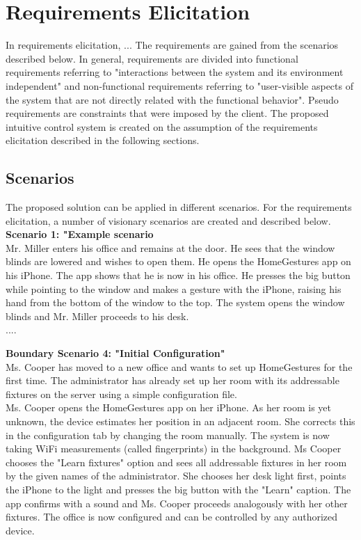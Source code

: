 
\chapter{Requirements Elicitation}
	
In requirements elicitation, ...
The requirements are gained from the scenarios described below. In general, requirements are divided into functional requirements referring to "interactions between the system and its environment independent" \cite{Bruegge2004} and non-functional requirements referring to "user-visible aspects of the system that are not directly related with the functional behavior". \cite{Bruegge2004} Pseudo requirements are constraints that were imposed by the client. The proposed intuitive control system is created on the assumption of the requirements elicitation described in the following sections.

\section{Scenarios}
\label{scenarios}

The proposed solution can be applied in different scenarios. For the requirements elicitation, a number of visionary scenarios are created and described below. \\

\textbf{Scenario 1: "Example scenario} \\
Mr. Miller enters his office and remains at the door. He sees that the window blinds are lowered and wishes to open them. He opens the HomeGestures app on his iPhone. The app shows that he is now in his office. He presses the big button while pointing to the window and makes a gesture with the iPhone, raising his hand from the bottom of the window to the top. The system opens the window blinds and Mr. Miller proceeds to his desk. \\


....


\textbf{Boundary Scenario 4: "Initial Configuration"} \\
Ms. Cooper has moved to a new office and wants to set up HomeGestures for the first time. The administrator has already set up her room with its addressable fixtures on the server using a simple configuration file. \\
Ms. Cooper opens the HomeGestures app on her iPhone. As her room is yet unknown, the device estimates her position in an adjacent room. She corrects this in the configuration tab by changing the room manually. The system is now taking WiFi measurements (called fingerprints) in the background. Ms Cooper chooses the "Learn fixtures" option and sees all addressable fixtures in her room by the given names of the administrator. She chooses her desk light first, points the iPhone to the light and presses the big button with the "Learn" caption. The app confirms with a sound and Ms. Cooper proceeds analogously with her other fixtures. The office is now configured and can be controlled by any authorized device.

